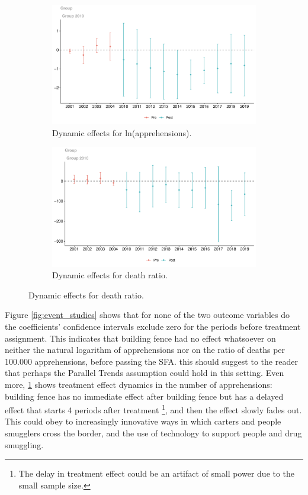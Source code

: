 \documentclass[titlepage]{article}
\theoremstyle{plain}
\theoremstyle{plain}
\begin{document}
\begin{figure}
	\caption{Event study for the outcome variables.}
	\label{fig:event_studies}
	\centering
	\begin{subfigure}[b]{0.48\textwidth}
		\caption{Dynamic effects for ln(apprehensions).}
		\label{fig:es_app}
		\centering
		\includegraphics[width=\textwidth]{_images/plot_es_app.pdf}
	\end{subfigure}
	\begin{subfigure}[b]{0.48\textwidth}
		\caption{Dynamic effects for death ratio.}
		\label{fig:es_death}
		\centering
		\includegraphics[width=\textwidth]{_images/plot_es_death.pdf}
	\end{subfigure}
\end{figure}

Figure \ref{fig:event_studies} shows that for none of the two outcome variables do the coefficients’ confidence intervals exclude zero for the periods before treatment assignment. This indicates that building fence had no effect whatsoever on  neither the natural logarithm of apprehensions nor on the ratio of deaths per 100.000 apprehensions, before passing the SFA. this should suggest to the reader that perhaps the Parallel Trends assumption could hold in this setting. Even more, \ref{fig:es_app} shows treatment effect dynamics in the number of apprehensions: building fence has no immediate effect after building fence but has a delayed effect that starts 4 periods after treatment \footnote{The delay in treatment effect could be an artifact of small power due to the small sample size.}, and then the effect slowly fades out. This could obey to increasingly innovative ways in which carters and people smugglers cross the border, and the use of technology to support people and drug smuggling.
\end{document}
